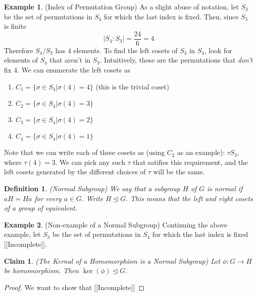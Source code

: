 \documentclass[12pt]{article}
\newtheorem{claim}{Claim}
\newtheorem{definition}{Definition}
\theoremstyle{definition}
\newtheorem{example}{Example}
\theoremstyle{definition}
\begin{document}
\begin{example}(Index of Permutation Group)
As a slight abuse of notation, let $S_3$ be the set of permutations in $S_4$ for which the last index is fixed. Then, since $S_3$ is finite
\begin{equation}
 	|S_4 : S_3| = \frac{24}{6} = 4
\end{equation} 
Therefore $S_4 / S_3$ has 4 elements. To find the left cosets of $S_3$ in $S_4$, look for elements of $S_4$ that aren't in $S_3$. Intuitively, these are the permutations that \textit{don't} fix 4. We can enumerate the left cosets as
\begin{enumerate}
	\item $C_1 = \{\sigma \in S_4 | \sigma(4) = 4 \}$ (this is the trivial coset)
	\item $C_2 = \{\sigma \in S_4 | \sigma(4) = 3 \}$
	\item $C_3 = \{\sigma \in S_4 | \sigma(4) = 2 \}$
	\item $C_4 = \{\sigma \in S_4 | \sigma(4) = 1 \}$
\end{enumerate}
Note that we can write each of these cosets as (using $C_2$ as an example): $\tau S_3$, where $\tau(4) = 3$. We can pick any such $\tau$ that satifies this requirement, and the left cosets generated by the different choices of $\tau$ will be the same.
\end{example}

\begin{definition}(Normal Subgroup)
We say that a subgroup $H$ of $G$ is normal if $aH = Ha$ for every $a \in G$. Write $H \trianglelefteq G$. This means that the left and right cosets of a group of equivalent.
\end{definition}

\begin{example}(Non-example of a Normal Subgroup)
Continuing the above example, let $S_3$ be the set of permutations in $S_4$ for which the last index is fixed [[Incomplete]].
\end{example}

\begin{claim}(The Kernal of a Homomorphism is a Normal Subgroup)
Let $\phi : G \to H$ be homomorphism. Then $\ker (\phi) \trianglelefteq G$.
\end{claim}
\begin{proof}

We want to show that [[Incomplete]]

\end{proof}
\end{document}
